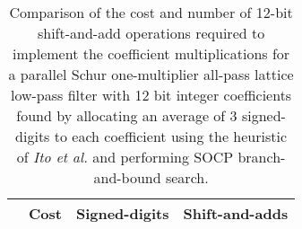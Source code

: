 \documentclass[a4paper,twoside,10pt,english]{report}
\begin{document}
\begin{table}[htb]
\centering
\begin{threeparttable}
\begin{tabular}{lccc}  \\ \toprule
& Cost&Signed-digits&Shift-and-adds\\ \midrule

\bottomrule
\end{tabular}
\end{threeparttable}
\caption[Summary of cost results for the parallel Schur one-multiplier
all-pass lattice lowpass filter SOCP algorithm example with 12 bit
coefficients] {Comparison of the cost and number of 12-bit shift-and-add
  operations required to implement the coefficient multiplications for a
  parallel Schur one-multiplier all-pass lattice low-pass filter with 12 bit
  integer coefficients found by allocating an average of 3 signed-digits to
  each coefficient using the heuristic of \emph{Ito et al.} and performing
  SOCP branch-and-bound search.}
\label{tab:branch-bound-schurOneMPAlattice-lowpass-12-nbits-cost-summary}
\end{table}
\clearpage
\end{document}
